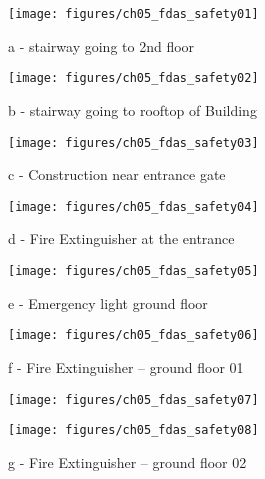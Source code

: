 \begin{figure}[!htb]
	\begin{minipage}[b]{0.22\linewidth}
		\centering
		\texttt{[image: figures/ch05\_fdas\_safety01]}
		\caption*{a - stairway going to 2nd floor}
	\end{minipage}
	\hspace{0.03cm}
	\begin{minipage}[b]{0.22\linewidth}
		\centering
		\texttt{[image: figures/ch05\_fdas\_safety02]}
		\caption*{b - stairway going to rooftop of Building}
	\end{minipage}
	\hspace{0.03cm}
	\begin{minipage}[b]{0.22\linewidth}
		\centering
		\texttt{[image: figures/ch05\_fdas\_safety03]}
		\caption*{c - Construction near entrance gate}
	\end{minipage}
	\hspace{0.03cm}
	\begin{minipage}[b]{0.22\linewidth}
		\centering
		\texttt{[image: figures/ch05\_fdas\_safety04]}
		\caption*{d - Fire Extinguisher at the entrance}
	\end{minipage}
	\hspace{0.03cm}
	\begin{minipage}[b]{0.22\linewidth}
		\centering
		\texttt{[image: figures/ch05\_fdas\_safety05]}
		\caption*{e - Emergency light ground floor}
	\end{minipage}
	\hspace{0.03cm}
	\begin{minipage}[b]{0.22\linewidth}
		\centering
		\texttt{[image: figures/ch05\_fdas\_safety06]}
		\caption*{f - Fire Extinguisher – ground floor 01}
	\end{minipage}
	\hspace{0.03cm}
	\begin{minipage}[b]{0.22\linewidth}
		\centering
		\texttt{[image: figures/ch05\_fdas\_safety07]}
		\caption*{g - Fire Extinguisher – ground floor 02}
	\end{minipage}
	\hspace{0.03cm}
\begin{minipage}[b]{0.22\linewidth}
	\centering
	\texttt{[image: figures/ch05\_fdas\_safety08]}

\end{minipage}
\end{figure}
